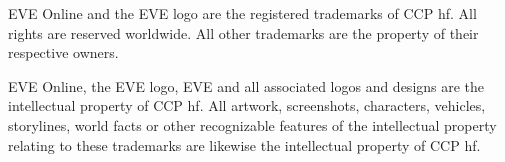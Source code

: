 EVE Online and the EVE logo are the registered trademarks of CCP hf. All rights are reserved worldwide. All other trademarks are the property of their respective owners.

EVE Online, the EVE logo, EVE and all associated logos and designs are the intellectual property of CCP hf. All artwork, screenshots, characters, vehicles, storylines, world facts or other recognizable features of the intellectual property relating to these trademarks are likewise the intellectual property of CCP hf. 
